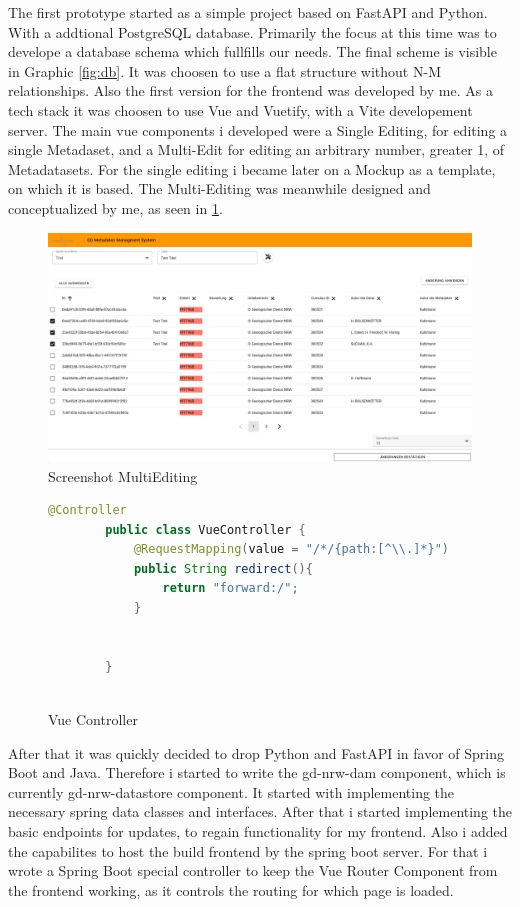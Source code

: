 \documentclass[11pt, titlepage, a4paper]{article}
\begin{document}
The first prototype started as a simple project based on FastAPI and Python. With a addtional PostgreSQL database. Primarily the focus at this time was to develope a database schema which fullfills our needs. The final scheme is visible in Graphic \ref{fig:db}. It was choosen to use a flat structure without N-M relationships. 
Also the first version for the frontend was developed by me. As a tech stack it was choosen to use Vue and Vuetify, with a Vite developement server. The main vue components i developed were a Single Editing, for editing a single Metadaset, and a Multi-Edit for editing an arbitrary number, greater 1, of Metadatasets. For the single editing i became later on a Mockup as a template, on which it is based. The Multi-Editing was meanwhile designed and conceptualized by me, as seen in \ref{fig:multiedit}. 

\begin{figure}[t]
	\caption{Screenshot MultiEditing}
	\label{fig:multiedit}
	\includegraphics[width=16cm]{multiedit.png}
	\centering
\end{figure}
\begin{figure}[t]
	\caption{Vue Controller}
	\label{fig:vue}
	\begin{lstlisting}[language=java]
        @Controller
        public class VueController {
            @RequestMapping(value = "/*/{path:[^\\.]*}")
            public String redirect(){
                return "forward:/";
            }
        
        
        }
        
        \end{lstlisting}
	\centering
\end{figure}


After that it was quickly decided to drop Python and FastAPI in favor of Spring Boot and Java. Therefore i started to write the gd-nrw-dam component, which is currently gd-nrw-datastore component. It started with implementing the necessary spring data classes and interfaces. After that i started implementing the basic endpoints for updates, to regain functionality for my frontend. Also i added the capabilites to host the build frontend by the spring boot server. For that i wrote a Spring Boot special controller to keep the Vue Router Component from the frontend working, as it controls the routing for which page is loaded. 
\end{document}
